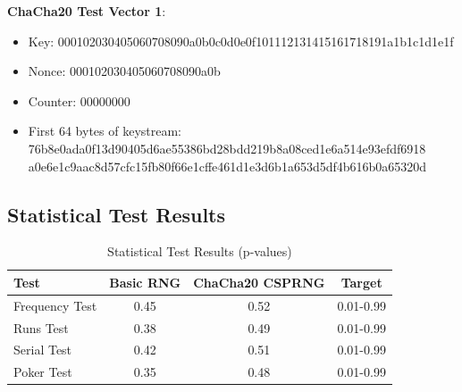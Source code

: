 \documentclass[11pt,a4paper]{article}
\begin{document}
\begin{examplebox}
\textbf{ChaCha20 Test Vector 1}:
\begin{itemize}
    \item Key: 000102030405060708090a0b0c0d0e0f101112131415161718191a1b1c1d1e1f
    \item Nonce: 000102030405060708090a0b
    \item Counter: 00000000
    \item First 64 bytes of keystream: \\
    76b8e0ada0f13d90405d6ae55386bd28bdd219b8a08ced1e6a514e93efdf6918 \\
    a0e6e1c9aac8d57cfc15fb80f66e1cffe461d1e3d6b1a653d5df4b616b0a65320d
\end{itemize}
\end{examplebox}

\subsection{Statistical Test Results}

\begin{table}[h]
\centering
\begin{tabular}{|l|c|c|c|}
\hline
\textbf{Test} & \textbf{Basic RNG} & \textbf{ChaCha20 CSPRNG} & \textbf{Target} \\
\hline
Frequency Test & 0.45 & 0.52 & 0.01-0.99 \\
Runs Test & 0.38 & 0.49 & 0.01-0.99 \\
Serial Test & 0.42 & 0.51 & 0.01-0.99 \\
Poker Test & 0.35 & 0.48 & 0.01-0.99 \\
\hline
\end{tabular}
\caption{Statistical Test Results (p-values)}
\end{table}
\end{document}
